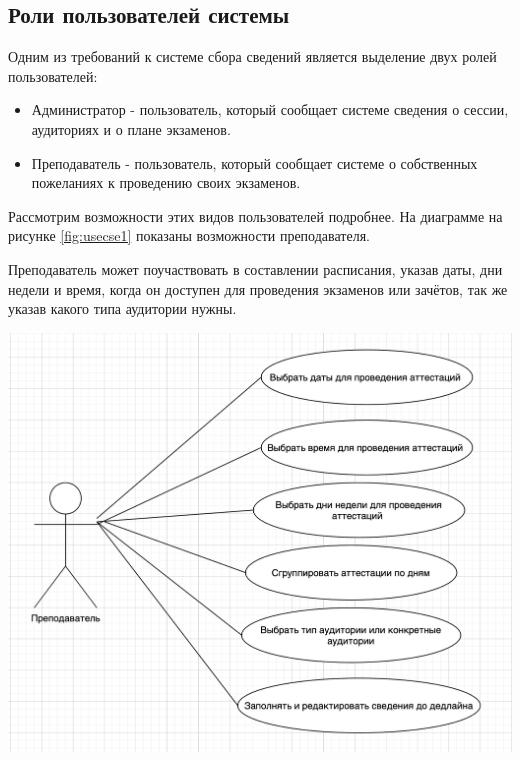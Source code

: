 \subsection{Роли пользователей системы}
Одним из требований к системе сбора сведений является выделение двух ролей пользователей:
\begin{itemize}
	\item Администратор - пользователь, который сообщает системе сведения о сессии, аудиториях и о плане экзаменов.
	\item Преподаватель - пользователь, который сообщает системе о собственных пожеланиях к проведению своих экзаменов.
\end{itemize}

Рассмотрим возможности этих видов пользователей подробнее. На диаграмме на рисунке \ref{fig:usecse1} показаны возможности преподавателя.

Преподаватель может поучаствовать в составлении расписания, указав даты, дни недели и время, когда он доступен для проведения экзаменов или зачётов, так же указав какого типа аудитории нужны.

\begin{minipage}{\textwidth}
	\centering
	\vspace{\mfloatsep} %
	\includegraphics[width=\columnwidth,height=\textheight, keepaspectratio=true] {my_folder/images/usecase1}
	\label{fig:usecse1}  
	\vspace{\mfloatsep} %
\end{minipage}

